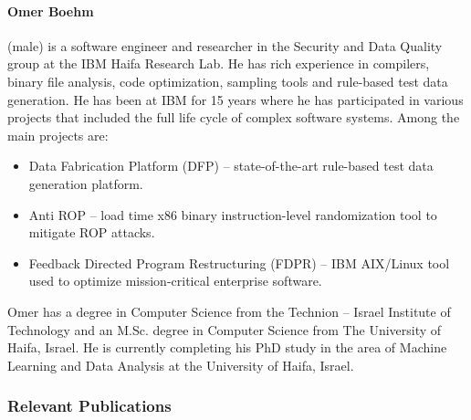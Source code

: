 \documentclass[a4paper,11pt]{article}
\begin{document}
\paragraph{Omer Boehm} (male) is a software engineer and researcher in the Security and Data Quality group at the IBM Haifa Research Lab. He has rich experience in compilers, binary file analysis, code optimization, sampling tools and rule-based test data generation. He has been at IBM for 15 years where he has participated in various projects that included the full life cycle of complex software systems. Among the main projects are:
\begin{itemize}
\item Data Fabrication Platform (DFP) – state-of-the-art rule-based test data generation platform.
\item Anti ROP – load time x86 binary instruction-level randomization tool to mitigate ROP attacks.
\item Feedback Directed Program Restructuring (FDPR) – IBM AIX/Linux tool used to optimize mission-critical enterprise software.
\end{itemize}
Omer has a degree in Computer Science from the Technion -- Israel Institute of Technology and an M.Sc. degree in Computer Science from The University of Haifa, Israel. He is currently completing his PhD study in the area of Machine Learning and Data Analysis at the University of Haifa, Israel.

\subsubsection*{Relevant Publications}
\end{document}
